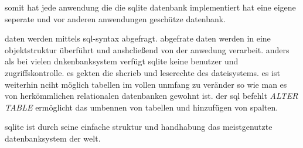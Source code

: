 somit hat jede anwendung die die sqlite datenbank implementiert hat eine eigene seperate und vor anderen anwendungen geschütze datenbank.

daten werden mittels sql-syntax abgefragt. abgefrate daten werden in eine objektstruktur überführt und anshcließend von der anwedung verarbeit. anders als bei vielen dnkenbanksystem verfügt sqlite keine benutzer und zugriffskontrolle. es gekten die shcrieb und leserechte des dateisystems. es ist weiterhin nciht möglich tabellen im vollen unmfang zu veränder so wie man es von herkömmlichen relationalen datenbanken gewohnt ist. der sql befehlt \textit{ALTER TABLE} ermöglicht das umbennen von tabellen und hinzufügen von spalten.

sqlite ist durch seine einfache struktur und handhabung das meistgenutzte datenbanksystem der welt.
